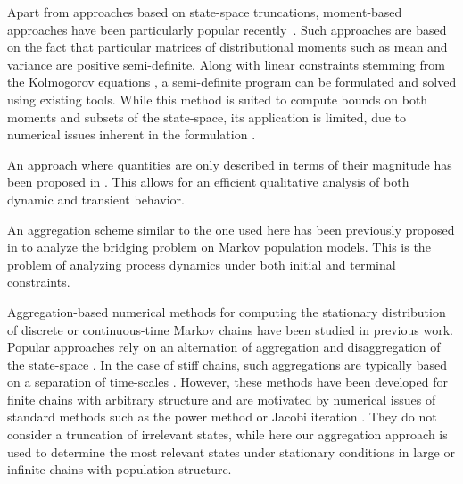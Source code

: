 Apart from approaches based on state-space truncations, moment-based approaches have been particularly popular recently~\cite{ghusinga2017exact,dowdy2018bounds,kuntz2017rigorous,sakurai2017convex}.
Such approaches are based on the fact that particular matrices of distributional moments such as mean and variance are positive semi-definite.
Along with linear constraints stemming from the Kolmogorov equations \cite{backenkohler2016generalized}, a semi-definite program can be formulated and solved using existing tools.
While this method is suited to compute bounds on both moments and subsets of the state-space, its application is limited, due to numerical issues inherent in the formulation \cite{dowdy2018bounds}.

An approach where quantities are only described in terms of their magnitude has been proposed in \citet{ceska2019semi}. This allows for an efficient qualitative analysis of both dynamic and transient behavior.

An aggregation scheme similar to the one used here has been previously proposed in \citet{backenkohler2020analysis} to analyze the bridging problem on Markov population models.
This is the problem of analyzing process dynamics under both initial and terminal constraints.

Aggregation-based numerical methods for computing the stationary distribution 
of discrete or continuous-time Markov chains have been studied in
previous work. Popular approaches rely on an alternation of aggregation and 
disaggregation of the state-space \cite{stewart1994introduction,schweitzer1991survey}.
In the case of stiff chains, such aggregations are typically based on 
a separation of time-scales \cite{cao1985iterative}.
However, these methods have been developed for finite chains with arbitrary structure and are motivated by numerical issues of standard methods such as 
the power method or Jacobi iteration \cite{stewart1994introduction}.
They do not consider a truncation of irrelevant states, while
here our aggregation approach is used to determine the most relevant states
under stationary conditions in large or infinite chains with population structure.


